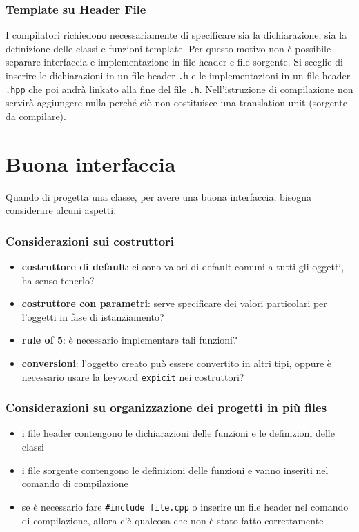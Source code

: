 \documentclass[a4paper]{article}
\begin{document}
\subsubsection*{Template su Header File}
I compilatori richiedono necessariamente di specificare sia la dichiarazione, sia la definizione delle classi e funzioni template.
Per questo motivo non è possibile separare interfaccia e implementazione in file header e file sorgente. Si sceglie di
inserire le dichiarazioni in un file header \verb|.h| e le implementazioni in un file header \verb|.hpp| che poi andrà linkato
alla fine del file \verb|.h|. Nell'istruzione di compilazione non servirà aggiungere nulla perché ciò non costituisce una
translation unit (sorgente da compilare).

\newpage

\section{Buona interfaccia}
Quando di progetta una classe, per avere una buona interfaccia, bisogna considerare alcuni aspetti.
\subsubsection*{Considerazioni sui costruttori}
\begin{itemize}
	\item \textbf{costruttore di default}: ci sono valori di default comuni a tutti gli oggetti, ha senso tenerlo?
	\item \textbf{costruttore con parametri}: serve specificare dei valori particolari per l'oggetti in fase di istanziamento?
	\item \textbf{rule of 5}: è necessario implementare tali funzioni?
	\item \textbf{conversioni}: l'oggetto creato può essere convertito in altri tipi, oppure è necessario usare la keyword
	\verb|expicit| nei costruttori?
\end{itemize}

\subsubsection*{Considerazioni su organizzazione dei progetti in più files}
\begin{itemize}
	\item i file header contengono le dichiarazioni delle funzioni e le definizioni delle classi
	\item i file sorgente contengono le definizioni delle funzioni e vanno inseriti nel comando di compilazione
	\item se è necessario fare \verb|#include file.cpp| o inserire un file header nel comando di compilazione, allora c'è qualcosa
	che non è stato fatto correttamente
\end{itemize}
\end{document}
